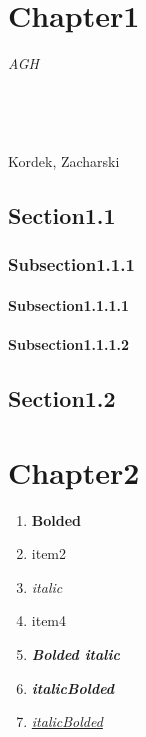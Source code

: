\documentclass{report}
\begin{document}
    
    \chapter{Chapter1}
    \textit{AGH}
\\
\\
\\
\\
\\
Kordek, Zacharski

    \section{Section1.1}

    \subsection{Subsection1.1.1}

    \subsubsection{Subsection1.1.1.1}
    \subsubsection{Subsection1.1.1.2}

    \section{Section1.2}

    \chapter{Chapter2}

    \begin{enumerate}
        \item \textbf{Bolded}
        \item item2
        \item \textit{italic}
        \item item4
        \item \textbf{\textit{Bolded italic}}
        \item \textit{\textbf{italicBolded}}
        \item \textit{\underline{italicBolded}}
    \end{enumerate}
\end{document}
